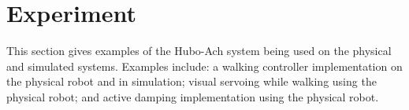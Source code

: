 \chapter{Experiment}






This section gives examples of the Hubo-Ach system being used on the physical and simulated systems.  Examples include: a walking controller implementation on the physical robot and in simulation; visual servoing while walking using the physical robot; and active damping implementation using the physical robot.






